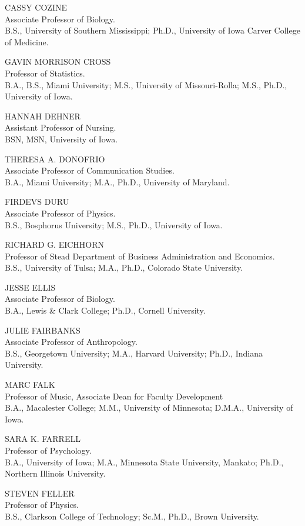 \documentclass[
  letterpaper,
]{scrbook}
\begin{document}
CASSY COZINE\\
Associate Professor of Biology.\\
B.S., University of Southern Mississippi; Ph.D., University of Iowa
Carver College of Medicine.

GAVIN MORRISON CROSS\\
Professor of Statistics.\\
B.A., B.S., Miami University; M.S., University of Missouri-Rolla; M.S.,
Ph.D., University of Iowa.

HANNAH DEHNER\\
Assistant Professor of Nursing.\\
BSN, MSN, University of Iowa.

THERESA A. DONOFRIO\\
Associate Professor of Communication Studies.\\
B.A., Miami University; M.A., Ph.D., University of Maryland.

FIRDEVS DURU\\
Associate Professor of Physics.\\
B.S., Bosphorus University; M.S., Ph.D., University of Iowa.

RICHARD G. EICHHORN\\
Professor of Stead Department of Business Administration and
Economics.\\
B.S., University of Tulsa; M.A., Ph.D., Colorado State University.

JESSE ELLIS\\
Associate Professor of Biology.\\
B.A., Lewis \& Clark College; Ph.D., Cornell University.

JULIE FAIRBANKS\\
Associate Professor of Anthropology.\\
B.S., Georgetown University; M.A., Harvard University; Ph.D., Indiana
University.

MARC FALK\\
Professor of Music, Associate Dean for Faculty Development\\
B.A., Macalester College; M.M., University of Minnesota; D.M.A.,
University of Iowa.

SARA K. FARRELL\\
Professor of Psychology.\\
B.A., University of Iowa; M.A., Minnesota State University, Mankato;
Ph.D., Northern Illinois University.

STEVEN FELLER\\
Professor of Physics.\\
B.S., Clarkson College of Technology; Sc.M., Ph.D., Brown University.
\end{document}
